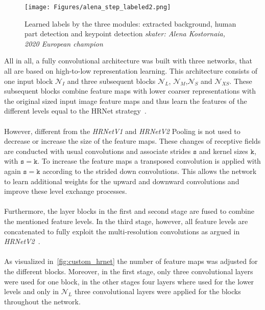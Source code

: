\begin{figure}
    \centering
    \texttt{[image: Figures/alena\_step\_labeled2.png]}
    \decoRule
    \caption[HRNetV3: Predictions from Alena Kostornaia's Steps]{Learned labels by the three modules: extracted background, human part detection and
    keypoint detection \textit{skater: Alena Kostornaia, 2020 European champion\cite{2020european}}}
    \label{fig:alena_step_labeled}
\end{figure}


All in all, a fully convolutional architecture was built with three networks, that all are based on high-to-low
representation learning. This architecture consists of one input block $\mathcal{N}_I$  and three subsequent blocks
$\mathcal{N}_L$, $\mathcal{N}_M$,$\mathcal{N}_S$ and $\mathcal{N}_{XS}$.
These subsequent blocks combine feature maps with lower coarser representations with the original sized input image
feature maps and thus learn the features of the different levels equal to the HRNet strategy~\cite{HRNetv2, HRNetv1}.
\\\mbox{}\\
However, different from the \textit{HRNetV1} and \textit{HRNetV2} Pooling is not used to decrease or increase the
size of the feature
maps. These changes of receptive fields are conducted with usual convolutions and associate strides $\mathtt{s}$ and
kernel sizes
$\mathtt{k}$, with $\mathtt{s}=\mathtt{k}$.
To increase the feature maps a transposed convolution is applied with again $\mathtt{s}=\mathtt{k}$ according to the
strided down convolutions.
This allows the network to learn additional weights for the upward and downward convolutions and improve these level
exchange processes.
\\\mbox{}\\
Furthermore, the layer blocks in the first and second stage are fused to combine the mentioned feature levels.
In the third stage, however, all feature levels are concatenated to fully exploit the multi-resolution convolutions
as argued in \textit{HRNetV2}~\cite{HRNetv2}.
\\\mbox{}\\
As visualized in~\ref{fig:custom_hrnet} the number of feature maps was adjusted for the different blocks.
Moreover, in the first stage, only three convolutional layers were used for one block, in the other stages four layers
where used for the lower levels and only in $\mathcal{N}_L$ three convolutional layers were applied for the blocks
throughout the network.
\\\mbox{}\\

